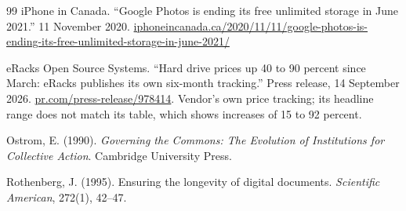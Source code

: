 \documentclass[11pt]{article}
\begin{document}
\begin{thebibliography}{99}
 iPhone in Canada. ``Google Photos is ending its free unlimited storage in June 2021.'' 11 November 2020. \url{iphoneincanada.ca/2020/11/11/google-photos-is-ending-its-free-unlimited-storage-in-june-2021/}

 eRacks Open Source Systems. ``Hard drive prices up 40 to 90 percent since March: eRacks publishes its own six-month tracking.'' Press release, 14 September 2026. \url{pr.com/press-release/978414}. Vendor's own price tracking; its headline range does not match its table, which shows increases of 15 to 92 percent.

 Ostrom, E. (1990). \emph{Governing the Commons: The Evolution of Institutions for Collective Action}. Cambridge University Press.

 Rothenberg, J. (1995). Ensuring the longevity of digital documents. \emph{Scientific American}, 272(1), 42--47.

\end{thebibliography}
\end{document}
